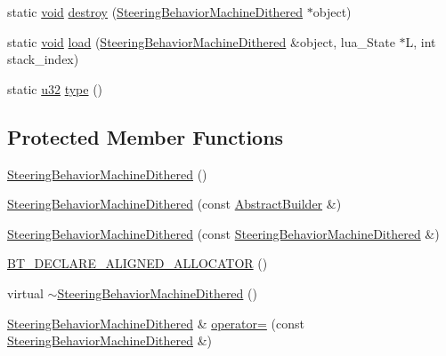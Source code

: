 \begin{DoxyCompactItemize}
static \mbox{\hyperlink{_thread_8h_af1e856da2e658414cb2456cb6f7ebc66}{void}} \mbox{\hyperlink{classnjli_1_1_steering_behavior_machine_dithered_a47e6bda038144ca774b2228e6c7a9599}{destroy}} (\mbox{\hyperlink{classnjli_1_1_steering_behavior_machine_dithered}{Steering\+Behavior\+Machine\+Dithered}} $\ast$object)
\item 
static \mbox{\hyperlink{_thread_8h_af1e856da2e658414cb2456cb6f7ebc66}{void}} \mbox{\hyperlink{classnjli_1_1_steering_behavior_machine_dithered_ab93199c4190ab5d21bbae89df461ae6a}{load}} (\mbox{\hyperlink{classnjli_1_1_steering_behavior_machine_dithered}{Steering\+Behavior\+Machine\+Dithered}} \&object, lua\+\_\+\+State $\ast$L, int stack\+\_\+index)
\item 
static \mbox{\hyperlink{_util_8h_a10e94b422ef0c20dcdec20d31a1f5049}{u32}} \mbox{\hyperlink{classnjli_1_1_steering_behavior_machine_dithered_a010e9f5b4f86832a6bcfedc724720582}{type}} ()
\end{DoxyCompactItemize}
\subsection*{Protected Member Functions}
\begin{DoxyCompactItemize}
\item 
\mbox{\hyperlink{classnjli_1_1_steering_behavior_machine_dithered_a5b4e9c96c351d5c3c131794e212eca17}{Steering\+Behavior\+Machine\+Dithered}} ()
\item 
\mbox{\hyperlink{classnjli_1_1_steering_behavior_machine_dithered_a2d2e873e8bd71450633d17f69dfc3e88}{Steering\+Behavior\+Machine\+Dithered}} (const \mbox{\hyperlink{classnjli_1_1_abstract_builder}{Abstract\+Builder}} \&)
\item 
\mbox{\hyperlink{classnjli_1_1_steering_behavior_machine_dithered_a43bbbc191a14382c38e3dd594e4de2ce}{Steering\+Behavior\+Machine\+Dithered}} (const \mbox{\hyperlink{classnjli_1_1_steering_behavior_machine_dithered}{Steering\+Behavior\+Machine\+Dithered}} \&)
\item 
\mbox{\hyperlink{classnjli_1_1_steering_behavior_machine_dithered_aabbb92a21b17dc5896e68c4e853d39e0}{B\+T\+\_\+\+D\+E\+C\+L\+A\+R\+E\+\_\+\+A\+L\+I\+G\+N\+E\+D\+\_\+\+A\+L\+L\+O\+C\+A\+T\+OR}} ()
\item 
virtual \mbox{\hyperlink{classnjli_1_1_steering_behavior_machine_dithered_a86ff4716635f7bca2ab38fd25d3ca9f7}{$\sim$\+Steering\+Behavior\+Machine\+Dithered}} ()
\item 
\mbox{\hyperlink{classnjli_1_1_steering_behavior_machine_dithered}{Steering\+Behavior\+Machine\+Dithered}} \& \mbox{\hyperlink{classnjli_1_1_steering_behavior_machine_dithered_a3e17391fe96d97e1731163912db7f941}{operator=}} (const \mbox{\hyperlink{classnjli_1_1_steering_behavior_machine_dithered}{Steering\+Behavior\+Machine\+Dithered}} \&)
\end{DoxyCompactItemize}
